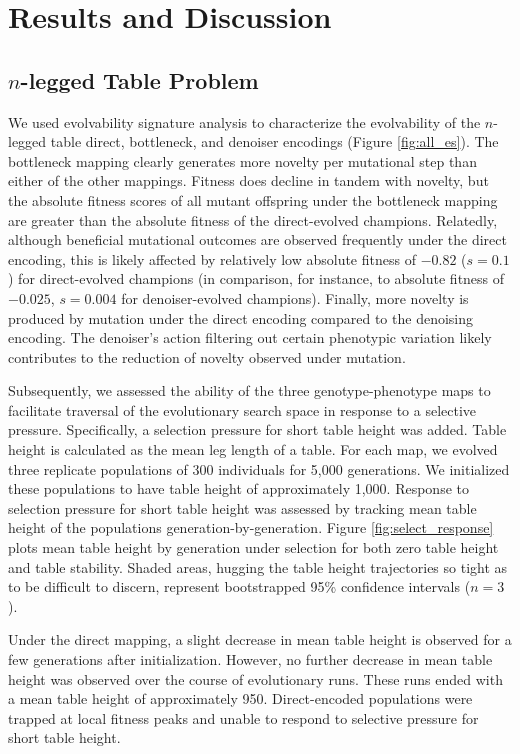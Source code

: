 \section{Results and Discussion} \label{sec:results}

\subsection{$n$-legged Table Problem}



We used evolvability signature analysis to characterize the evolvability of the $n$-legged table direct, bottleneck, and denoiser encodings (Figure \ref{fig:all_es}).
The bottleneck mapping clearly generates more novelty per mutational step than either of the other mappings.
Fitness does decline in tandem with novelty, but the absolute fitness scores of all mutant offspring under the bottleneck mapping are greater than the absolute fitness of the direct-evolved champions.
Relatedly, although beneficial mutational outcomes are observed frequently under the direct encoding, this is likely affected by relatively low absolute fitness of $-0.82$ ($s=0.1$) for direct-evolved champions (in comparison, for instance, to absolute fitness of $-0.025$, $s=0.004$ for denoiser-evolved champions).
Finally, more novelty is produced by mutation under the direct encoding compared to the denoising encoding.
The denoiser's action filtering out certain phenotypic variation likely contributes to the reduction of novelty observed under mutation.

Subsequently, we assessed the ability of the three genotype-phenotype maps to facilitate traversal of the evolutionary search space in response to a selective pressure.
Specifically, a selection pressure for short table height was added.
Table height is calculated as the mean leg length of a table.
For each map, we evolved three replicate populations of 300 individuals for 5,000 generations.
We initialized these populations to have table height of approximately 1,000.
Response to selection pressure for short table height was assessed by tracking mean table height of the populations generation-by-generation.
Figure \ref{fig:select_response} plots mean table height by generation under selection for both zero table height and table stability.
Shaded areas, hugging the table height trajectories so tight as to be difficult to discern, represent bootstrapped 95\% confidence intervals ($n=3$).

Under the direct mapping, a slight decrease in mean table height is observed for a few generations after initialization.
However, no further decrease in mean table height was observed over the course of evolutionary runs.
These runs ended with a mean table height of approximately 950.
Direct-encoded populations were trapped at local fitness peaks and unable to respond to selective pressure for short table height.

